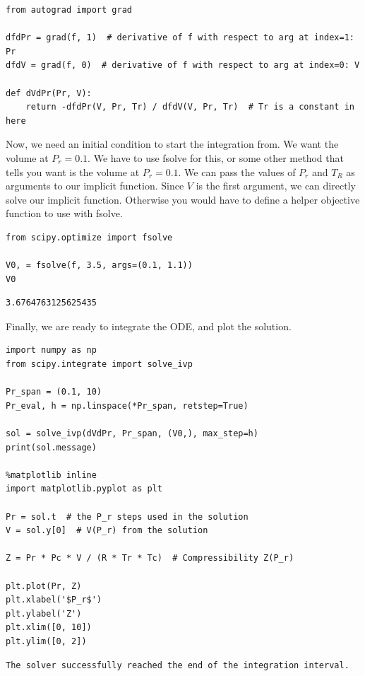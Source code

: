\documentclass[11pt]{article}
\begin{document}
\begin{verbatim}
from autograd import grad

dfdPr = grad(f, 1)  # derivative of f with respect to arg at index=1: Pr
dfdV = grad(f, 0)  # derivative of f with respect to arg at index=0: V

def dVdPr(Pr, V):
    return -dfdPr(V, Pr, Tr) / dfdV(V, Pr, Tr)  # Tr is a constant in here
\end{verbatim}

Now, we need an initial condition to start the integration from. We want the volume at \(P_r=0.1\). We have to use fsolve for this, or some other method that tells you want is the volume at \(P_r=0.1\). We can pass the values of \(P_r\) and \(T_R\) as arguments to our implicit function. Since \(V\) is the first argument, we can directly solve our implicit function. Otherwise you would have to define a helper objective function to use with fsolve.

\begin{verbatim}
from scipy.optimize import fsolve

V0, = fsolve(f, 3.5, args=(0.1, 1.1))
V0
\end{verbatim}

\begin{verbatim}
3.6764763125625435
\end{verbatim}

Finally, we are ready to integrate the ODE, and plot the solution.

\begin{verbatim}
import numpy as np
from scipy.integrate import solve_ivp

Pr_span = (0.1, 10)
Pr_eval, h = np.linspace(*Pr_span, retstep=True)

sol = solve_ivp(dVdPr, Pr_span, (V0,), max_step=h)
print(sol.message)

%matplotlib inline
import matplotlib.pyplot as plt

Pr = sol.t  # the P_r steps used in the solution
V = sol.y[0]  # V(P_r) from the solution

Z = Pr * Pc * V / (R * Tr * Tc)  # Compressibility Z(P_r)

plt.plot(Pr, Z)
plt.xlabel('$P_r$')
plt.ylabel('Z')
plt.xlim([0, 10])
plt.ylim([0, 2])
\end{verbatim}

\begin{verbatim}
The solver successfully reached the end of the integration interval.

\end{verbatim}
\end{document}
